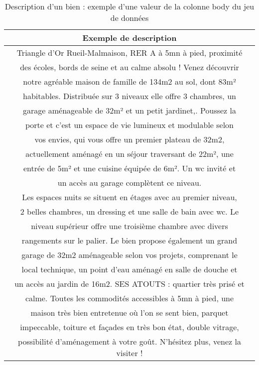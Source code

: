 \documentclass[a4paper, 12pt, twoside]{report}
\begin{document}
		\begin{table}[h]
			\begin{center}
				\begin{tabular}{|c|}
				\hline
				Exemple de description \\
				\hline 
				Triangle d'Or Rueil-Malmaison, RER A à 5mn à pied, proximité \\
				des écoles, bords de seine et au calme absolu ! Venez découvrir \\
				notre agréable maison de famille de 134m2 au sol, dont 83m² \\
				habitables. Distribuée sur 3 niveaux elle offre 3 chambres, un \\
				garage aménageable de 32m² et un petit jardinet,. Poussez la \\
				porte et c’est un espace de vie lumineux et modulable selon \\
				vos envies, qui vous offre un premier plateau de 32m2, \\
				actuellement aménagé en un séjour traversant de 22m², une \\
				entrée de 5m² et une cuisine équipée de 6m². Un wc invité et \\
				un accès au garage complètent ce niveau. \\
				Les espaces nuits se situent en étages avec au premier niveau, \\
				2 belles chambres, un dressing et une salle de bain avec wc. Le \\
				niveau supérieur offre une troisième chambre avec divers \\
				rangements sur le palier. Le bien propose également un grand \\
				garage de 32m2 aménageable selon vos projets, comprenant le \\
				local technique, un point d’eau aménagé en salle de douche et \\
				un accès au jardin de 16m2. SES ATOUTS : quartier très prisé et \\
				calme. Toutes les commodités accessibles à 5mn à pied, une \\
				maison très bien entretenue où l’on se sent bien, parquet \\
				impeccable, toiture et façades en très bon état, double vitrage, \\
				possibilité d’aménagement à votre goût. N’hésitez plus, venez la visiter ! \\ 
				\hline 
				\end{tabular} 
			\end{center}
			\label{tabExempleDescription}
			\caption{Description d'un bien : exemple d'une valeur de la colonne body du jeu de données}
		\end{table}
\end{document}

